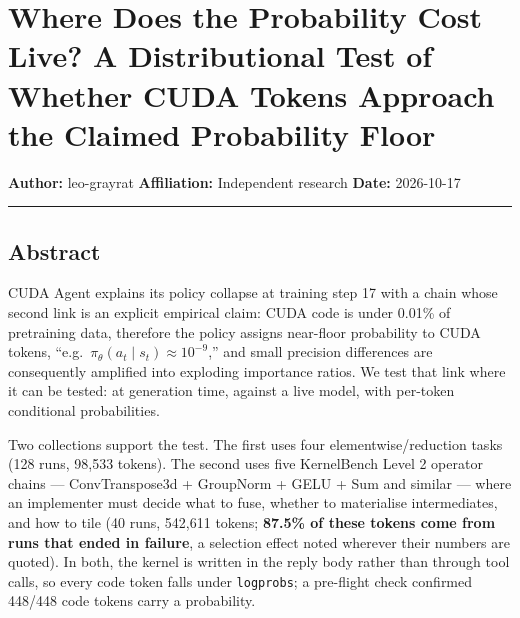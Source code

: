 \documentclass[
  11pt,
]{article}
\author{}
\date{}
\begin{document}
\hypertarget{where-does-the-probability-cost-live-a-distributional-test-of-whether-cuda-tokens-approach-the-claimed-probability-floor}{%
\section{Where Does the Probability Cost Live? A Distributional Test of
Whether CUDA Tokens Approach the Claimed Probability
Floor}\label{where-does-the-probability-cost-live-a-distributional-test-of-whether-cuda-tokens-approach-the-claimed-probability-floor}}

\textbf{Author:} leo-grayrat \textbf{Affiliation:} Independent research
\textbf{Date:} 2026-10-17

\begin{center}\rule{0.5\linewidth}{0.5pt}\end{center}

\hypertarget{abstract}{%
\subsection{Abstract}\label{abstract}}

CUDA Agent explains its policy collapse at training step 17 with a chain
whose second link is an explicit empirical claim: CUDA code is under
0.01\% of pretraining data, therefore the policy assigns near-floor
probability to CUDA tokens,
``e.g.~\(\pi_\theta(a_t \mid s_t) \approx 10^{-9}\),'' and small
precision differences are consequently amplified into exploding
importance ratios. We test that link where it can be tested: at
generation time, against a live model, with per-token conditional
probabilities.

Two collections support the test. The first uses four
elementwise/reduction tasks (128 runs, 98,533 tokens). The second uses
five KernelBench Level 2 operator chains --- ConvTranspose3d + GroupNorm
+ GELU + Sum and similar --- where an implementer must decide what to
fuse, whether to materialise intermediates, and how to tile (40 runs,
542,611 tokens; \textbf{87.5\% of these tokens come from runs that ended
in failure}, a selection effect noted wherever their numbers are
quoted). In both, the kernel is written in the reply body rather than
through tool calls, so every code token falls under \texttt{logprobs}; a
pre-flight check confirmed 448/448 code tokens carry a probability.
\end{document}
